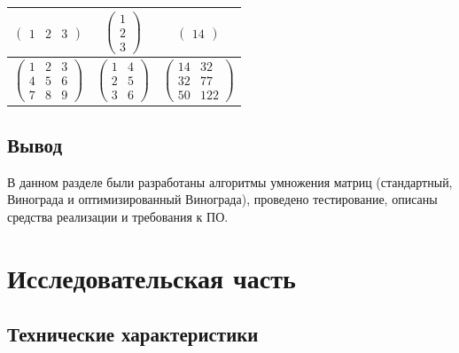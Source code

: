 \documentclass[a4paper,14pt, unknownkeysallowed]{extreport}
\begin{document}
\begin{table}[h]
\begin{center}
\begin{threeparttable}
\begin{tabular}{|c|c|c|}
			\\ \hline
			$\begin{pmatrix}
				1 & 2 & 3
			\end{pmatrix}$ &
			$\begin{pmatrix}
				1\\
				2\\
				3
			\end{pmatrix}$ &
			$\begin{pmatrix}
				14
			\end{pmatrix}$ 

			\\ \hline
			$\begin{pmatrix}
				1 & 2 & 3 \\
				4 & 5 & 6 \\
				7 & 8 & 9
			\end{pmatrix}$ &
			$\begin{pmatrix}
				1 & 4\\
				2 & 5\\
				3 & 6
			\end{pmatrix}$ &
			$\begin{pmatrix}
				14 & 32 \\
				32 & 77 \\
				50 & 122
			\end{pmatrix}$                  
			\\ \hline
		\end{tabular}
	\end{threeparttable}
	\end{center}
\end{table}

\section{Вывод}

В данном разделе были разработаны алгоритмы умножения матриц (стандартный, Винограда и оптимизированный Винограда), проведено тестирование, описаны средства реализации и требования к ПО.





\chapter{Исследовательская часть}

\section{Технические характеристики}
\end{document}
